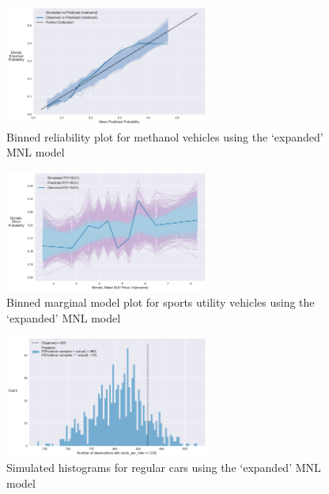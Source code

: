 \documentclass[preprint]{elsarticle}
\begin{document}
\begin{figure}
\centering
\includegraphics[width=0.6\textwidth]{reliability-plot-vehicle-choice-interaction-mnl-methanol-point}
\caption{Binned reliability plot for methanol vehicles using the `expanded' MNL model}
\label{fig:new-mnl-methanol-reliability}
\end{figure}

\begin{figure}
\centering
\includegraphics[width=0.6\textwidth]{marginal-model-plot-vehicle-choice-interaction-mnl-suv}
\caption{Binned marginal model plot for sports utility vehicles using the `expanded' MNL model}
\label{fig:new-mnl-suv-marginal}
\end{figure}

\begin{figure}
\centering
\includegraphics[width=0.6\textwidth]{histogram-vehicle-choice-interaction-mnl-regcar-operating-costs}
\caption{Simulated histograms for regular cars using the `expanded' MNL model}
\label{fig:new-mnl-regcar-histogram}
\end{figure}
\end{document}
